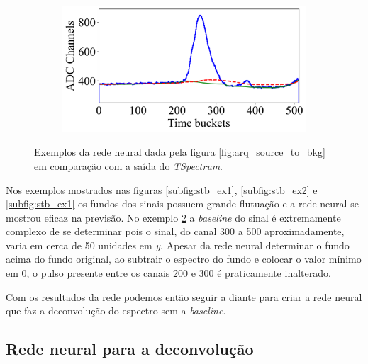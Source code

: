 \documentclass[a4paper,12pt,oneside]{book}
\begin{document}
\begin{figure}[H]
\begin{subfigure}[b]{0.49\textwidth}
        \caption{}
        \label{subfig:stb_ex3}
    \end{subfigure}%
    \hfill
    \begin{subfigure}[b]{0.46\textwidth}
        \centering
        \includegraphics[scale=0.43]{figs/stb_4.png}
        \caption{}
        \label{subfig:stb_ex4}
    \end{subfigure}
\caption{Exemplos da rede neural dada pela figura \ref{fig:arq_source_to_bkg} em comparação com a saída do \textit{TSpectrum}.}
\label{fig:stb_examples}
\end{figure}

\par Nos exemplos mostrados nas figuras \ref{subfig:stb_ex1}, \ref{subfig:stb_ex2} e \ref{subfig:stb_ex1} os fundos dos sinais possuem grande flutuação e a rede neural se mostrou eficaz na previsão. No exemplo \ref{subfig:stb_ex4} a \textit{baseline} do sinal é extremamente complexo de se determinar pois o sinal, do canal 300 a 500 aproximadamente, varia em cerca de 50 unidades em \textit{y}. Apesar da rede neural determinar o fundo acima do fundo original, ao subtrair o espectro do fundo e colocar o valor mínimo em 0, o pulso presente entre os canais 200 e 300 é praticamente inalterado.

\par Com os resultados da rede podemos então seguir a diante para criar a rede neural que faz a deconvolução do espectro sem a \textit{baseline}.

\subsection{Rede neural para a deconvolução}

\end{document}

